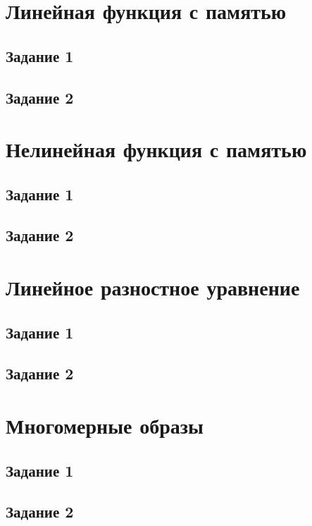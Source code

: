 \section{Линейная функция с памятью}

\subsection{Задание 1}

\subsection{Задание 2}

\section{Нелинейная функция с памятью}

\subsection{Задание 1}

\subsection{Задание 2}

\section{Линейное разностное уравнение}

\subsection{Задание 1}

\subsection{Задание 2}

\section{Многомерные образы}

\subsection{Задание 1}

\subsection{Задание 2}

